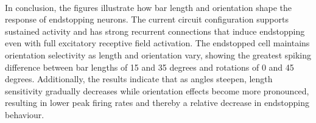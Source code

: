 \documentclass[12pt]{article}
\begin{document}
\\
In conclusion, the figures illustrate how bar length and orientation shape the response of endstopping neurons. The current circuit configuration supports sustained activity and has strong recurrent connections that induce endstopping even with full excitatory receptive field activation. The endstopped cell maintains orientation selectivity as length and orientation vary, showing the greatest spiking difference between bar lengths of 15 and 35 degrees and rotations of 0 and 45 degrees. Additionally, the results indicate that as angles steepen, length sensitivity gradually decreases while orientation effects become more pronounced, resulting in lower peak firing rates and thereby a relative decrease in endstopping behaviour.
\vspace*{-\headsep}
\vspace*{-\headheight}
\vspace*{-60pt} %
\end{document}

